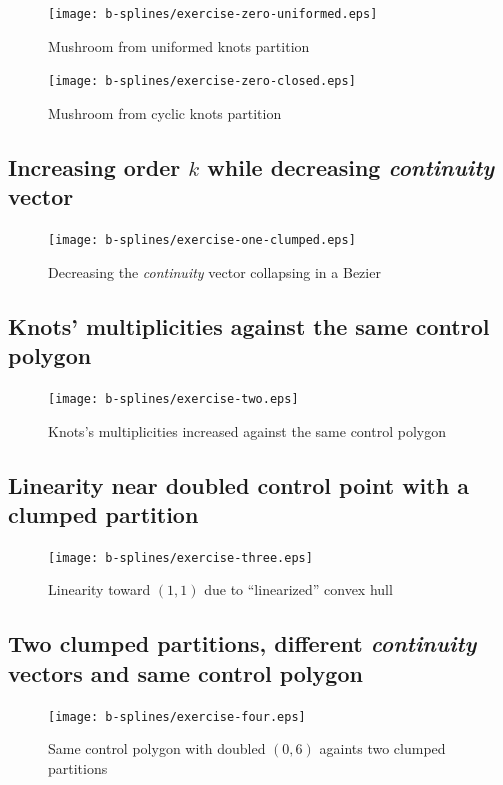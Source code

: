 \documentclass{article}
\begin{document}
\begin{figure}[h!]
  \centering
  \texttt{[image: b-splines/exercise-zero-uniformed.eps]}
  \caption{Mushroom from uniformed knots partition}
  \label{fig:uniformed-mushroom}
\end{figure}

\begin{figure}[h!]
  \centering
  \texttt{[image: b-splines/exercise-zero-closed.eps]}
  \caption{Mushroom from cyclic knots partition}
  \label{fig:closed-mushroom}
\end{figure}

\subsection{Increasing order $k$ while decreasing \emph{continuity} vector }
\begin{figure}[h!]
  \centering
  \texttt{[image: b-splines/exercise-one-clumped.eps]}
  \caption{Decreasing the \emph{continuity} vector collapsing in a Bezier }
  \label{fig:bspline-exercise-one-clumped}
\end{figure}

\subsection{Knots' multiplicities against the same control polygon}
\begin{figure}[h!]
  \centering
  \texttt{[image: b-splines/exercise-two.eps]}
  \caption{Knots's multiplicities increased against the same control polygon }
  \label{fig:bspline-exercise-two}
\end{figure}

\subsection{Linearity near doubled control point with a clumped partition}
\begin{figure}[h!]
  \centering
  \texttt{[image: b-splines/exercise-three.eps]}
  \caption{Linearity toward $(1,1)$ due to ``linearized'' convex hull}
  \label{fig:bspline-exercise-three}
\end{figure}

\subsection{Two clumped partitions, different \emph{continuity} vectors and same control polygon}
\begin{figure}[h!]
  \centering
  \texttt{[image: b-splines/exercise-four.eps]}
  \caption{Same control polygon with doubled $(0,6)$ againts two clumped partitions}
  \label{fig:bspline-exercise-four}
\end{figure}
\end{document}
